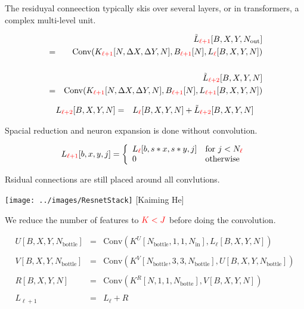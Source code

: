 {The residuyal conneection typically skis over several layers, or in transformers, a complex multi-level unit.

\vfill
{\Large
\begin{eqnarray*}
& & \tilde{L}_{\color{red} \ell+1}[B,X,Y,N_{\mathrm{out}}] \\
& = & \mathrm{Conv}(K_{\color{red} \ell+1}[N,\Delta X,\Delta Y,N],B_{\color{red} \ell+1}[N],L_{\color{red} \ell}[B,X,Y,N]) \\
\\
& & \tilde{L}_{\color{red} \ell+2}[B,X,Y,N] \\
& = & \mathrm{Conv}(K_{\color{red} \ell+1}[N,\Delta X,\Delta Y,N],B_{\color{red} \ell+1}[N],L_{\color{red} \ell+1}[B,X,Y,N])
\end{eqnarray*}
}

\begin{eqnarray*}
L_{\color{red} \ell+2}[B,X,Y,N] & = & L_{\color{red}\ell}[B,X,Y,N] + \tilde{L}_{\color{red} \ell+2}[B,X,Y,N]
\end{eqnarray*}



Spacial reduction and neuron expansion is done without convolution.

\vfill

$$L_{\color{red} \ell+1}[b,x,y,j]  =  \left\{\begin{array}{ll} L_{\color{red} \ell}[b,s*x,s*y,j] & \mbox{for $j < N_{\color{red} \ell}$} \\ 0 & \mbox{otherwise} \end{array}\right.$$

\vfill
Rsidual connections are still placed around all convlutions.


\centerline{\texttt{[image: ../images/ResnetStack]} {\large [Kaiming He]}}


\newcommand{\Nout}{N_{\mathrm{out}}}
\newcommand{\Nin}{N_{\mathrm{in}}}

We reduce the number of features to ${\color{red} K < J}$ before doing the convolution.

{\huge
\begin{eqnarray*}
U[B,X,Y,N_{\mathrm{bottle}}] & = & \mathrm{Conv}(K^U[N_{\mathrm{bottle}},1,1,\Nin],L_\ell[B,X,Y,N]) \\
\\
V[B,X,Y,N_{\mathrm{bottle}}] & = & \mathrm{Conv}(K^V[N_{\mathrm{bottle}},3,3,N_\mathrm{bottle}],U[B,X,Y,N_{\mathrm{bottle}}]) \\
\\
R[B,X,Y,N] & = & \mathrm{Conv}(K^R[N,1,1,N_{\mathrm{botte}}],V[B,X,Y,N]) \\
\\
L_{ \ell+1} & = & L_\ell + R
\end{eqnarray*}
}

}
